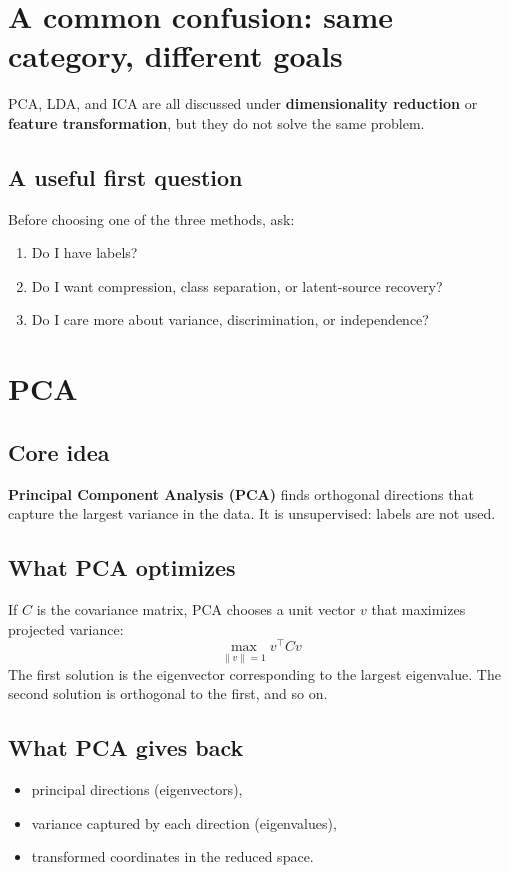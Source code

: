 \documentclass[11pt]{article}
\begin{document}
\section{A common confusion: same category, different goals}
PCA, LDA, and ICA are all discussed under \textbf{dimensionality reduction} or \textbf{feature transformation}, but they do not solve the same problem.

\subsection{A useful first question}
Before choosing one of the three methods, ask:
\begin{enumerate}[leftmargin=*]
  \item Do I have labels?
  \item Do I want compression, class separation, or latent-source recovery?
  \item Do I care more about variance, discrimination, or independence?
\end{enumerate}

\section{PCA}
\subsection{Core idea}
\textbf{Principal Component Analysis (PCA)} finds orthogonal directions that capture the largest variance in the data.
It is unsupervised: labels are not used.

\subsection{What PCA optimizes}
If $C$ is the covariance matrix, PCA chooses a unit vector $v$ that maximizes projected variance:
\[
  \max_{\|v\|=1} v^\top C v
\]
The first solution is the eigenvector corresponding to the largest eigenvalue.
The second solution is orthogonal to the first, and so on.

\subsection{What PCA gives back}
\begin{itemize}[leftmargin=*]
  \item principal directions (eigenvectors),
  \item variance captured by each direction (eigenvalues),
  \item transformed coordinates in the reduced space.
\end{itemize}
\end{document}
